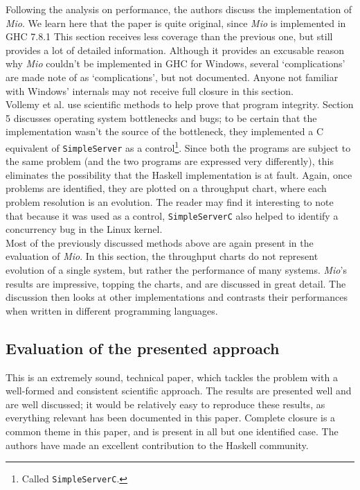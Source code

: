 \documentclass[9pt]{report}
\begin{document}
\noindent
Following the analysis on performance, the authors discuss the implementation of {\it Mio}.
We learn here that the paper is quite original, since {\it Mio} is implemented in GHC 7.8.1
This section receives less coverage than the previous one, but still provides a lot of detailed information.
Although it provides an excusable reason why {\it Mio} couldn't be implemented in GHC for Windows, several `complications' are made note of as `complications', but not documented.
Anyone not familiar with Windows' internals may not receive full closure in this section.\\

\noindent
Vollemy et al. use scientific methods to help prove that program integrity.
Section 5 discusses operating system bottlenecks and bugs; to be certain that the implementation wasn't the source of the bottleneck, they implemented a C equivalent of \verb/SimpleServer/ as a control\footnote{Called \texttt{SimpleServerC}.}.
Since both the programs are subject to the same problem (and the two programs are expressed very differently), this eliminates the possibility that the Haskell implementation is at fault.
Again, once problems are identified, they are plotted on a throughput chart, where each problem resolution is an evolution.
The reader may find it interesting to note that because it was used as a control, \verb/SimpleServerC/ also helped to identify a concurrency bug in the Linux kernel.\\

\noindent
Most of the previously discussed methods above are again present in the evaluation of {\it Mio}.
In this section, the throughput charts do not represent evolution of a single system, but rather the performance of many systems.
{\it Mio}'s results are impressive, topping the charts, and are discussed in great detail.
The discussion then looks at other implementations and contrasts their performances when written in different programming languages.

\subsection*{Evaluation of the presented approach}
This is an extremely sound, technical paper, which tackles the problem with a well-formed and consistent scientific approach.
The results are presented well and are well discussed; it would be relatively easy to reproduce these results, as everything relevant has been documented in this paper.
Complete closure is a common theme in this paper, and is present in all but one identified case.
The authors have made an excellent contribution to the Haskell community.
\end{document}
